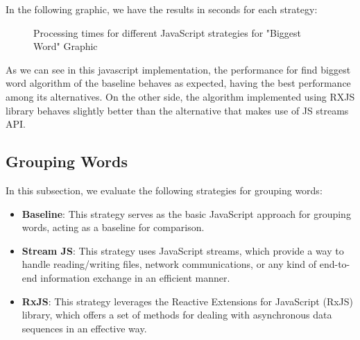 In the following graphic, we have the results in seconds for each strategy:


\begin{figure}[H]
    \raggedright
    \caption{Processing times for different JavaScript strategies for "Biggest Word" Graphic}
    \label{fig:biggest_word_processing_times_js}
\end{figure}

As we can see in this javascript implementation, the performance for find biggest word algorithm of the baseline behaves as expected, having the best performance among its alternatives. On the other side, the algorithm implemented using RXJS library behaves slightly better than the alternative that makes use of JS streams API.


\clearpage



\subsection{Grouping Words}
\label{subsec:grouping_words_js}

In this subsection, we evaluate the following strategies for grouping words:

\begin{itemize}
    \item \textbf{Baseline}: This strategy serves as the basic JavaScript approach for grouping words, acting as a baseline for comparison.
    \item \textbf{Stream JS}: This strategy uses JavaScript streams, which provide a way to handle reading/writing files, network communications, or any kind of end-to-end information exchange in an efficient manner.
    \item \textbf{RxJS}: This strategy leverages the Reactive Extensions for JavaScript (RxJS) library, which offers a set of methods for dealing with asynchronous data sequences in an effective way.
\end{itemize}

